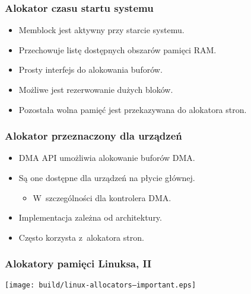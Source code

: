 \begin{frame}
  \frametitle{Alokator czasu startu systemu}

  \begin{itemize}
  \item Memblock jest aktywny przy starcie systemu.
  \item Przechowuje listę dostępnych obszarów pamięci RAM.
  \item Prosty interfejs do alokowania buforów.
  \item Możliwe jest rezerwowanie dużych bloków.
  \item Pozostała wolna pamięć jest przekazywana do alokatora stron.
  \end{itemize}
\end{frame}

\begin{frame}
  \frametitle{Alokator przeznaczony dla urządzeń}

  \begin{itemize}
  \item DMA API umożliwia alokowanie buforów DMA.
  \item Są one dostępne dla urządzeń na płycie głównej.
    \begin{itemize}
    \item W~szczególności dla kontrolera DMA.
    \end{itemize}
  \item Implementacja zależna od architektury.
  \item Często korzysta z~alokatora stron.
  \end{itemize}
\end{frame}

\begin{frame}
  \frametitle{Alokatory pamięci Linuksa, II}

  \begin{center}
   \texttt{[image: build/linux-allocators--important.eps]}
  \end{center}
\end{frame}
